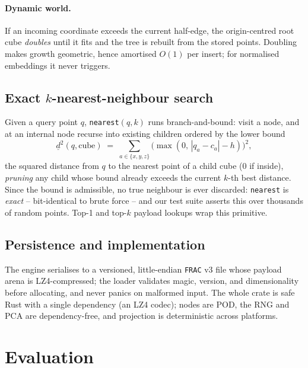 \documentclass[11pt]{article}
\begin{document}
\paragraph{Dynamic world.} If an incoming coordinate exceeds the current
half-edge, the origin-centred root cube \emph{doubles} until it fits and the tree
is rebuilt from the stored points. Doubling makes growth geometric, hence
amortised $O(1)$ per insert; for normalised embeddings it never triggers.

\subsection{Exact $k$-nearest-neighbour search}
Given a query point $q$, \texttt{nearest}$(q,k)$ runs branch-and-bound:
visit a node, and at an internal node recurse into existing children ordered by
the lower bound
\begin{equation}
\underline{d}^2(q,\text{cube}) \;=\; \sum_{a\in\{x,y,z\}} \big(\max(0,\,|q_a-c_a|-h)\big)^2,
\end{equation}
the squared distance from $q$ to the nearest point of a child cube (0 if inside),
\emph{pruning} any child whose bound already exceeds the current $k$-th best
distance. Since the bound is admissible, no true neighbour is ever discarded:
\texttt{nearest} is \emph{exact} -- bit-identical to brute force -- and our test
suite asserts this over thousands of random points. Top-1 and top-$k$ payload
lookups wrap this primitive.

\subsection{Persistence and implementation}
The engine serialises to a versioned, little-endian \texttt{FRAC} v3 file whose
payload arena is LZ4-compressed; the loader validates magic, version, and
dimensionality before allocating, and never panics on malformed input. The whole
crate is safe Rust with a single dependency (an LZ4 codec); nodes are POD, the
RNG and PCA are dependency-free, and projection is deterministic across platforms.

\section{Evaluation}
\label{sec:eval}
\end{document}
